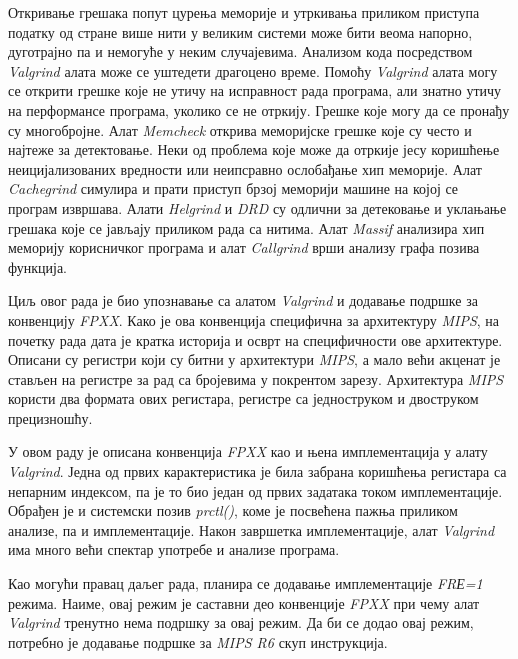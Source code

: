 \documentclass[12pt,oneside]{memoir}
\begin{document}
\indent Откривање грешака попут цурења меморије и утркивања приликом приступа податку од стране више нити у великим системи може бити веома напорно, дуготрајно па и немогуће у неким случајевима. Анализом кода посредством \textit{Valgrind} алата може се уштедети драгоцено време. Помоћу \textit{Valgrind} алата могу се открити грешке које не утичу на исправност рада програма, али знатно утичу на перформансе програма, уколико се не отркију. Грешке које могу да се пронађу су многобројне. Алат \textit{Memcheck} открива меморијске грешке које су често и најтеже за детектовање. Неки од проблема које може да отркије јесу коришћење неицијализованих вредности или неипсравно ослобађање хип меморије. Алат \textit{Cachegrind} симулира и прати приступ брзој меморији машине на којој се програм  извршава. Алати \textit{Helgrind} и \textit{DRD} су одлични за детековање и уклањање грешака које се јављају приликом рада са нитима. Алат \textit{Massif} анализира хип меморију корисничког програма и алат \textit{Callgrind} врши анализу графа позива функција.

\indent Циљ овог рада је био упознавање са алатом \textit{Valgrind} и додавање подршке за конвенцију \textit{FPXX}. Како је ова конвенција специфична за архитектуру \textit{MIPS}, на почетку рада дата је кратка историја и осврт на специфичности ове архитектуре. Описани су регистри који су битни у архитектури \textit{MIPS}, а мало већи акценат је стављен на регистре за рад са бројевима у покрентом зарезу. Архитектура \textit{MIPS} користи два формата ових регистара, регистре са једноструком и двоструком прецизношћу.

\indent У овом раду је описана конвенција \textit{FPXX} као и њена имплементација у алату \textit{Valgrind}. Једна од првих карактеристика је била забрана коришћења регистара са непарним индексом, па је то био један од првих задатака током имплементације. Обрађен је и системски позив \textit{prctl()}, коме је посвећена пажња приликом анализе, па и имплементације. Након завршетка имплементације, алат \textit{Valgrind} има много већи спектар употребе и анализе програма.

\indent Као могући правац даљег рада, планира се додавање имплементације \textit{FRЕ=1} режима. Наиме, овај режим је саставни део конвенције \textit{FPXX} при чему алат \textit{Valgrind} тренутно нема подршку за овај режим. Да би се додао овај режим, потребно је додавање подршке за \textit{MIPS R6} скуп инструкција.


\end{document}

